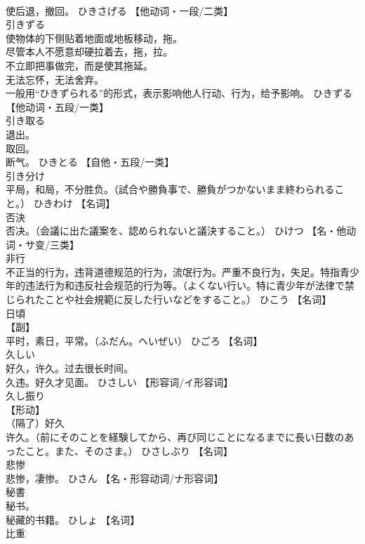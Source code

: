 \documentclass[8pt]{extreport}
\begin{document}
\begin{CJK}{UTF8}{min}
\\	使后退，撤回。	ひきさげる		【他动词・一段/二类】
\\	引きずる	
\\	使物体的下侧贴着地面或地板移动，拖。 
\\	尽管本人不愿意却硬拉着去，拖，拉。 
\\	不立即把事做完，而是使其拖延。 
\\	无法忘怀，无法舍弃。 
\\	一般用“ひきずられる”的形式，表示影响他人行动、行为，给予影响。	ひきずる		【他动词・五段/一类】
\\	引き取る	
\\	退出。 
\\	取回。 
\\	断气。	ひきとる		【自他・五段/一类】
\\	引き分け	
\\	平局，和局，不分胜负。（試合や勝負事で、勝負がつかないまま終わられること。）	ひきわけ		【名词】
\\	否決	
\\	否决。（会議に出た議案を、認められないと議決すること。）	ひけつ		【名・他动词・サ变/三类】
\\	非行	
\\	不正当的行为，违背道德规范的行为，流氓行为。严重不良行为，失足。特指青少年的违法行为和违反社会规范的行为等。（よくない行い。特に青少年が法律で禁じられたことや社会規範に反した行いなどをすること。）	ひこう		【名词】
\\	日頃	
\\	【副】 
\\	平时，素日，平常。（ふだん。へいぜい）	ひごろ		【名词】
\\	久しい	
\\	好久，许久。过去很长时间。 
\\	久违。好久才见面。	ひさしい		【形容词/イ形容词】
\\	久し振り	
\\	【形动】 
\\	（隔了）好久
\\	许久。（前にそのことを経験してから、再び同じことになるまでに長い日数のあったこと。また、そのさま。）	ひさしぶり		【名词】
\\	悲惨	
\\	悲惨，凄惨。	ひさん		【名・形容动词/ナ形容词】
\\	秘書	
\\	秘书。 
\\	秘藏的书籍。	ひしょ		【名词】
\\	比重	

\end{CJK}
\end{document}

